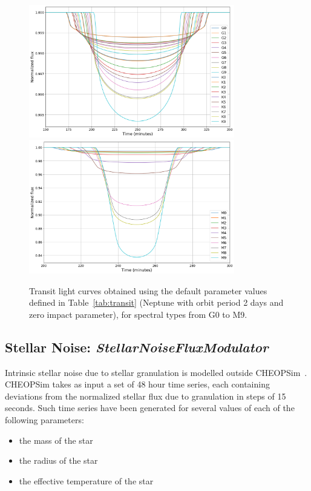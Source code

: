 \documentclass[11pt]{article}      %
\def\HCode#1{}
\def\htmlanchor#1{\HCode{<a id="#1"></a>}}
\begin{document}
\begin{figure}[hbtp]
  \begin{center}
    {\includegraphics[width=0.8\textwidth]{limbDarkening_GK.png}}
    {\includegraphics[width=0.8\textwidth]{limbDarkening_M.png}}
    \caption{Transit light curves obtained using the default parameter values defined in Table~\ref{tab:transit} (Neptune with orbit period 2 days and zero impact parameter), for spectral types from G0 to M9.}
    \label{fig:incidentLightCurve2}
  \end{center}
\end{figure}

\clearpage 
\htmlanchor{StellarNoiseFluxModulator}
\subsection{Stellar Noise:  {\it StellarNoiseFluxModulator}}
\label{sec:StellarNoiseFluxModulator}

Intrinsic stellar noise due to stellar granulation is modelled outside CHEOPSim~\cite{granularity}. CHEOPSim takes as input a set of 48 hour time series, each containing deviations from the normalized stellar flux due to granulation in steps of 15 seconds. Such time series have been generated for several values of each of the following parameters:
\begin{itemize}
\item the mass of the star
\item the radius of the star
\item the effective temperature of the star
\end{itemize}
\end{document}
